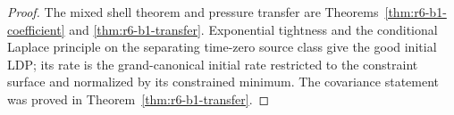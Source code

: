 \begin{proof}
The mixed shell theorem and pressure transfer are
Theorems~\ref{thm:r6-b1-coefficient} and
\ref{thm:r6-b1-transfer}.  Exponential tightness and the conditional Laplace
principle on the separating time-zero source class give the good initial LDP;
its rate is the grand-canonical initial rate restricted to the constraint
surface and normalized by its constrained minimum.  The covariance statement
was proved in Theorem~\ref{thm:r6-b1-transfer}.
\end{proof}
